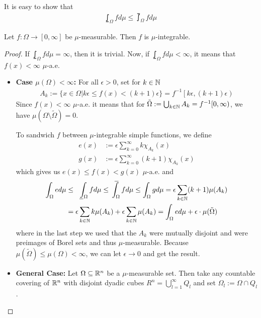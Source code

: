 It is easy to show that
\begin{align*}
 \lowint_{\Omega} f d \mu \leq \upint_{\Omega} f d \mu
\end{align*}

\begin{prop}[] \label{prop:measurable-implies-integrable}
  Let $f: \Omega \to [0,\infty]$ be $\mu$-measurable. Then $f$ is $\mu$-integrable.
\end{prop}
\begin{proof}
  If $\lowint_{\Omega} f d \mu = \infty$, then it is trivial.
  Now, if $\lowint_{\Omega}f d \mu < \infty$, it means that $f(x) < \infty$ $\mu$-a.e.

  \begin{itemize}
    \item \textbf{Case $\mu(\Omega) < \infty$:}
      For all $\epsilon > 0$, set for $k \in \mathbb{N}$
      \begin{align*}
        A_k := \{x \in \Omega \big\vert k \epsilon \leq f(x) < (k+1)\epsilon\} = f^{-1}\left[k \epsilon, (k+1)\epsilon\right)
      \end{align*}
      Since $f(x) < \infty$ $\mu$-a.e. it means that for $\tilde{\Omega} := \bigcup_{k \in \mathbb{N}} A_k = f^{-1}[0,\infty)$, we have $\mu(\Omega \setminus \tilde{\Omega}) = 0$.

      To sandwich $f$ between $\mu$-integrable simple functions, we define
      \begin{align*}
        e(x) &:= \epsilon \sum_{k=0}^{\infty} k \chi_{A_k}(x)\\
        g(x) &:= \epsilon \sum_{k=0}^{\infty} (k+1) \chi_{A_k}(x)
      \end{align*}
      which gives us $e(x) \leq f(x) < g(x)$ $\mu$-a.e. and
      \begin{align*}
        \int_{\Omega}e d \mu 
        &\leq 
        \lowint_{\Omega} f d \mu 
        \leq \upint_{\Omega} f d \mu 
        \leq \int_{\Omega} g d \mu
        = \epsilon\sum_{k \in \N}(k+1) \mu(A_k)\\
        &= \epsilon \sum_{k\in \N} k \mu(A_k) + \epsilon \sum_{k \in \N} \mu(A_k)
        = \int_{\Omega} e d \mu + \epsilon \cdot \mu(\tilde{\Omega})
      \end{align*}
      where in the last step we used that the $A_k$ were mutually disjoint and were preimages of Borel sets and thus $\mu$-measurable.
      Because $\mu(\tilde{\Omega}) \leq \mu(\Omega) < \infty$, we can let $\epsilon \to 0$ and get the result.

    \item \textbf{General Case:} Let $\Omega \subseteq \mathbb{R}^{n}$ be a $\mu$-measurable set. 
      Then take any countable covering of $\mathbb{R}^{n}$ with disjoint dyadic cubes $R^{n} = \bigcup_{l=1}^{\infty}Q_l$ and set $\Omega_l := \Omega \cap Q_l$.


\end{itemize}
\end{proof}
